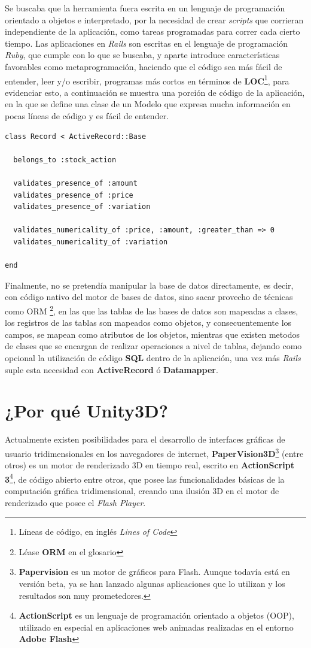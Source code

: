 Se buscaba que la herramienta fuera escrita en un lenguaje de programación orientado a objetos e interpretado, por la necesidad de crear \emph{scripts} que corrieran independiente de la aplicación, como tareas programadas para correr cada cierto tiempo. Las aplicaciones en \emph{Rails} son escritas en el lenguaje de programación \emph{Ruby}, que cumple con lo que se buscaba, y aparte introduce características favorables como metaprogramación, haciendo que el código sea más fácil de entender, leer y/o escribir, programas más cortos en términos de \textbf{LOC}\footnote{Líneas de código, en inglés \emph{Lines of Code}}, para evidenciar esto, a continuación se muestra una porción de código de la aplicación, en la que se define una clase de un Modelo que expresa mucha información en pocas líneas de código y es fácil de entender.

\begin{verbatim}
class Record < ActiveRecord::Base  

  belongs_to :stock_action

  validates_presence_of :amount
  validates_presence_of :price
  validates_presence_of :variation

  validates_numericality_of :price, :amount, :greater_than => 0
  validates_numericality_of :variation

end
\end{verbatim}

Finalmente, no se pretendía manipular la base de datos directamente, es decir, con código nativo del motor de bases de datos, sino sacar provecho de técnicas como ORM \footnote{Léase \textbf{ORM} en el glosario}, en las que las tablas de las bases de datos son mapeadas a clases, los registros de las tablas son mapeados como objetos, y consecuentemente los campos, se mapean como atributos de los objetos, mientras que existen metodos de clases que se encargan de realizar operaciones a nivel de tablas, dejando como opcional la utilización de código \textbf{SQL} dentro de la aplicación, una vez más \emph{Rails} suple esta necesidad con \textbf{ActiveRecord} ó \textbf{Datamapper}.

\section{¿Por qué Unity3D?}

Actualmente existen posibilidades para el desarrollo de interfaces gráficas de usuario tridimensionales en los navegadores de internet, \textbf{PaperVision3D}\footnote{\textbf{Papervision} es un motor de gráficos para Flash. Aunque todavía está en versión beta, ya se han lanzado algunas aplicaciones que lo utilizan y los resultados son muy prometedores.} (entre otros) es un motor de renderizado 3D en tiempo real, escrito en \textbf{ActionScript 3}\footnote{\textbf{ActionScript} es un lenguaje de programación orientado a objetos (OOP), utilizado en especial en aplicaciones web animadas realizadas en el entorno \textbf{Adobe Flash}}, de código abierto entre otros, que posee las funcionalidades básicas de la computación gráfica tridimensional, creando una ilusión 3D en el motor de renderizado que posee el \emph{Flash Player}. \\

